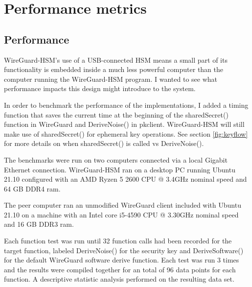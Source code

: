 \documentclass [11pt, proquest] {uwthesis}[2020/02/24]
\begin{document}
\section{Performance metrics}

\subsection{Performance}
\label{performance}
WireGuard-HSM's use of a USB-connected HSM means a small part of its functionality is embedded inside a much less powerful computer than the computer running the WireGuard-HSM program. I wanted to see what performance impacts this design might introduce to the system. 

In order to benchmark the performance of the implementations, I added a timing function that saves the current time at the beginning of the sharedSecret() function in WireGuard and DeriveNoise() in pkclient. WireGuard-HSM will still make use of sharedSecret() for ephemeral key operations.
See section \ref{fig:keyflow} for more details on when sharedSecret() is called vs DeriveNoise().

The benchmarks were run on two computers connected via a local Gigabit Ethernet connection. 
WireGuard-HSM ran on a desktop PC running Ubuntu 21.10 configured with an AMD Ryzen 5 2600 CPU @ 3.4GHz nominal speed and 64 GB DDR4 ram. 

The peer computer ran an unmodified WireGuard client included with Ubuntu 21.10 on a machine with an Intel core i5-4590 CPU @ 3.30GHz nominal speed and 16 GB DDR3 ram.  

Each function test was run until 32 function calls had been recorded for the target function, labeled DeriveNoise() for the security key and DeriveSoftware() for the default WireGuard software derive function.
Each test was run 3 times and the results were compiled together for an total of 96 data points for each function. A descriptive statistic analysis performed on the resulting data set.
\end{document}
